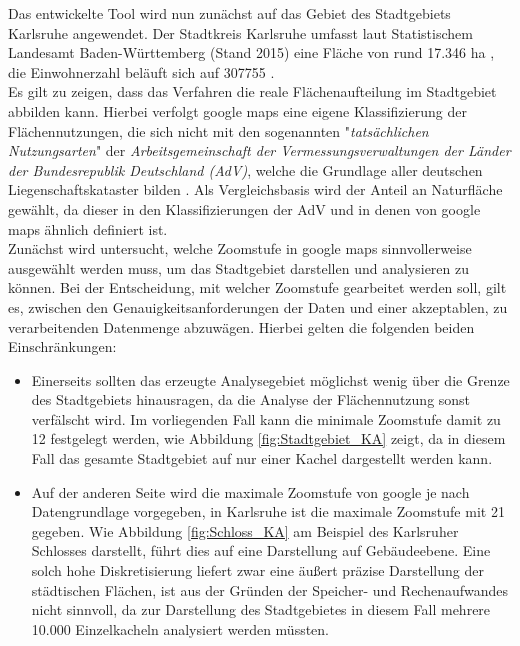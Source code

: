 Das entwickelte Tool wird nun zunächst auf das Gebiet des Stadtgebiets Karlsruhe angewendet. Der Stadtkreis Karlsruhe umfasst laut Statistischem Landesamt Baden-Württemberg (Stand 2015) eine Fläche von rund \num{17.346} \si{\hectare} \cite{StatBaWu_Flaeche}, die Einwohnerzahl beläuft sich auf \num{307755} \cite{StatBaWu_Einw}.\\
Es gilt zu zeigen, dass das Verfahren die reale Flächenaufteilung im Stadtgebiet abbilden kann. Hierbei verfolgt google maps eine eigene Klassifizierung der Flächennutzungen, die sich nicht mit den sogenannten "\textit{tatsächlichen Nutzungsarten}" der  \textit{Arbeitsgemeinschaft der Vermessungsverwaltungen der Länder der Bundesrepublik Deutschland (AdV)}, welche die Grundlage aller deutschen Liegenschaftskataster bilden \cite{advnutz} . Als Vergleichsbasis wird der Anteil an Naturfläche gewählt, da dieser in den Klassifizierungen der AdV und in denen von google maps ähnlich definiert ist.\\ 
\newline
Zunächst wird untersucht, welche Zoomstufe in google maps sinnvollerweise ausgewählt werden muss, um das Stadtgebiet darstellen und analysieren zu können. Bei der Entscheidung, mit welcher Zoomstufe gearbeitet werden soll, gilt es, zwischen den Genauigkeitsanforderungen  der Daten und einer akzeptablen, zu verarbeitenden Datenmenge abzuwägen. Hierbei gelten die folgenden beiden Einschränkungen:\\
\begin{itemize}
\item Einerseits sollten das erzeugte Analysegebiet möglichst wenig über die Grenze des Stadtgebiets hinausragen, da die Analyse der Flächennutzung sonst verfälscht wird. Im vorliegenden Fall kann die minimale Zoomstufe damit zu 12 festgelegt werden, wie Abbildung \ref{fig:Stadtgebiet_KA} zeigt, da in diesem Fall das gesamte Stadtgebiet auf nur einer Kachel dargestellt werden kann.
\item Auf der anderen Seite wird die maximale Zoomstufe von google je nach Datengrundlage vorgegeben, in Karlsruhe ist die maximale Zoomstufe mit 21 gegeben. Wie Abbildung \ref{fig:Schloss_KA} am Beispiel des Karlsruher Schlosses darstellt, führt dies auf eine Darstellung auf Gebäudeebene. Eine solch hohe Diskretisierung liefert zwar eine äußert präzise Darstellung der städtischen Flächen, ist aus der Gründen der Speicher- und Rechenaufwandes nicht sinnvoll, da zur Darstellung des Stadtgebietes in diesem Fall mehrere 10.000 Einzelkacheln analysiert werden müssten.
\end{itemize}
